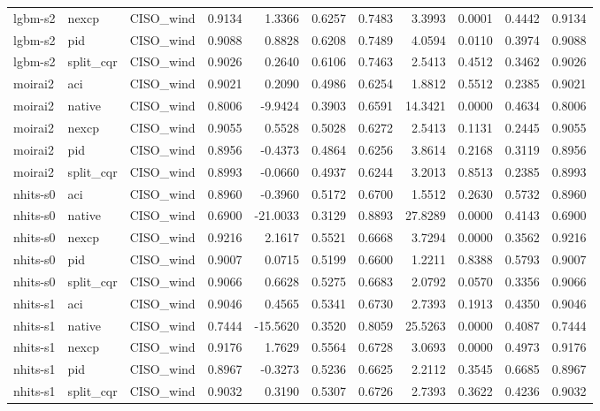 \begin{tabular}{lllrrrrrrrr}
lgbm-s2 & nexcp & CISO_wind & 0.9134 & 1.3366 & 0.6257 & 0.7483 & 3.3993 & 0.0001 & 0.4442 & 0.9134 \\
lgbm-s2 & pid & CISO_wind & 0.9088 & 0.8828 & 0.6208 & 0.7489 & 4.0594 & 0.0110 & 0.3974 & 0.9088 \\
lgbm-s2 & split_cqr & CISO_wind & 0.9026 & 0.2640 & 0.6106 & 0.7463 & 2.5413 & 0.4512 & 0.3462 & 0.9026 \\
moirai2 & aci & CISO_wind & 0.9021 & 0.2090 & 0.4986 & 0.6254 & 1.8812 & 0.5512 & 0.2385 & 0.9021 \\
moirai2 & native & CISO_wind & 0.8006 & -9.9424 & 0.3903 & 0.6591 & 14.3421 & 0.0000 & 0.4634 & 0.8006 \\
moirai2 & nexcp & CISO_wind & 0.9055 & 0.5528 & 0.5028 & 0.6272 & 2.5413 & 0.1131 & 0.2445 & 0.9055 \\
moirai2 & pid & CISO_wind & 0.8956 & -0.4373 & 0.4864 & 0.6256 & 3.8614 & 0.2168 & 0.3119 & 0.8956 \\
moirai2 & split_cqr & CISO_wind & 0.8993 & -0.0660 & 0.4937 & 0.6244 & 3.2013 & 0.8513 & 0.2385 & 0.8993 \\
nhits-s0 & aci & CISO_wind & 0.8960 & -0.3960 & 0.5172 & 0.6700 & 1.5512 & 0.2630 & 0.5732 & 0.8960 \\
nhits-s0 & native & CISO_wind & 0.6900 & -21.0033 & 0.3129 & 0.8893 & 27.8289 & 0.0000 & 0.4143 & 0.6900 \\
nhits-s0 & nexcp & CISO_wind & 0.9216 & 2.1617 & 0.5521 & 0.6668 & 3.7294 & 0.0000 & 0.3562 & 0.9216 \\
nhits-s0 & pid & CISO_wind & 0.9007 & 0.0715 & 0.5199 & 0.6600 & 1.2211 & 0.8388 & 0.5793 & 0.9007 \\
nhits-s0 & split_cqr & CISO_wind & 0.9066 & 0.6628 & 0.5275 & 0.6683 & 2.0792 & 0.0570 & 0.3356 & 0.9066 \\
nhits-s1 & aci & CISO_wind & 0.9046 & 0.4565 & 0.5341 & 0.6730 & 2.7393 & 0.1913 & 0.4350 & 0.9046 \\
nhits-s1 & native & CISO_wind & 0.7444 & -15.5620 & 0.3520 & 0.8059 & 25.5263 & 0.0000 & 0.4087 & 0.7444 \\
nhits-s1 & nexcp & CISO_wind & 0.9176 & 1.7629 & 0.5564 & 0.6728 & 3.0693 & 0.0000 & 0.4973 & 0.9176 \\
nhits-s1 & pid & CISO_wind & 0.8967 & -0.3273 & 0.5236 & 0.6625 & 2.2112 & 0.3545 & 0.6685 & 0.8967 \\
nhits-s1 & split_cqr & CISO_wind & 0.9032 & 0.3190 & 0.5307 & 0.6726 & 2.7393 & 0.3622 & 0.4236 & 0.9032 \\

\end{tabular}
